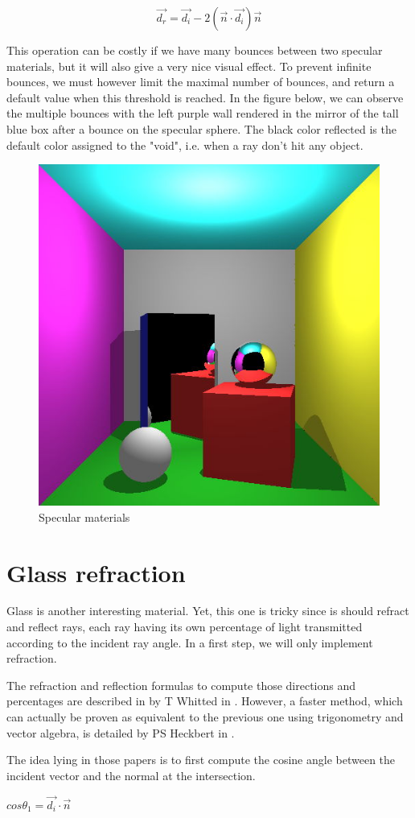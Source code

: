\begin{equation}
\vec{d_r} = \vec{d_i} - 2 (\vec{n} \cdot \vec{d_i}) \vec{n}
\label{eq:specular}
\end{equation}

This operation can be costly if we have many bounces between two specular materials, but it will also give a very nice visual effect. To prevent infinite bounces, we must however limit the maximal number of bounces, and return a default value when this threshold is reached. In the figure below, we can observe the multiple bounces with the left purple wall rendered in the mirror of the tall blue box after a bounce on the specular sphere. The black color reflected is the default color assigned to the "void", i.e. when a ray don't hit any object.

\begin{figure}[H]
\centering
\includegraphics[width=0.35\linewidth]{img/specular.jpg}
\caption{Specular materials}
\end{figure}


\section{Glass refraction}
Glass is another interesting material. Yet, this one is tricky since is should refract and reflect rays, each ray having its own percentage of light transmitted according to the incident ray angle. In a first step, we will only implement refraction.

The refraction and reflection formulas to compute those directions and percentages are described in by T Whitted in \cite{whitted1979improved}. However, a faster method, which can actually be proven as equivalent to the previous one using trigonometry and vector algebra, is detailed by PS Heckbert in \cite{heckbert1989derivation}.

The idea lying in those papers is to first compute the cosine angle between the incident vector and the normal at the intersection.

$ cos\theta_1 = \vec{d_i} \cdot \vec{n} $

